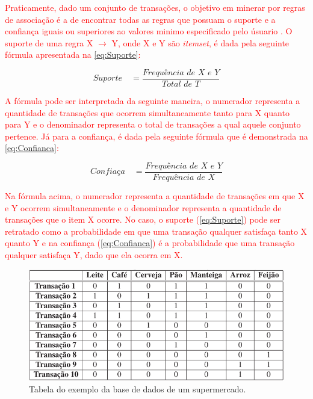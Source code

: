 \textcolor{red}{Praticamente, dado um conjunto de transações, o objetivo em minerar por regras de associação é a de encontrar todas as regras que possuam o suporte e a confiança iguais ou superiores ao valores minimo especificado pelo úsuario \cite{Vasconcelos2004}. O suporte de uma regra X $\rightarrow$ Y, onde X e Y são  \textit{itemset}, é dada pela seguinte fórmula apresentada na \autoref{eq:Suporte}:}


\begin{equation}
    \label{eq:Suporte}
        {\textit{Suporte}\quad =\frac { \textit{Frequência de X e Y} }{ \textit{Total de T}} }
\end{equation}

\par
\textcolor{red}{A fórmula pode ser interpretada da seguinte maneira, o numerador representa a quantidade de transações que ocorrem simultaneamente tanto para X quanto para Y e o denominador representa o total de transações a qual aquele conjunto pertence. Já para a confiança, é dada pela seguinte fórmula que é demonstrada na \autoref{eq:Confianca}:}

\begin{equation}
    \label{eq:Confianca}
        {\textit{Confiaça}\quad =\frac { \textit{Frequência de X e Y} }{ \textit{Frequência de X}} }
\end{equation}

\par
\textcolor{red}{Na fórmula acima, o numerador representa a quantidade de transações em que X e Y ocorrem simultaneamente e o denominador representa a quantidade de transações que o item X ocorre. No caso, o suporte (\autoref{eq:Suporte}) pode ser retratado como a probabilidade em que uma transação qualquer satisfaça tanto X quanto Y e na confiança (\autoref{eq:Confianca}) é a probabilidade que uma transação qualquer satisfaça Y, dado que ela ocorra em X.}

\begin{figure}[!htp]
	\begin{center}
    \caption{\label{fig:waveform_fig} Tabela do exemplo da base de dados de um supermercado.}
	\includegraphics[scale=0.80]{Figuras/Tabela_da_base_de_supermercado.png}
	\end{center}
\end{figure}

